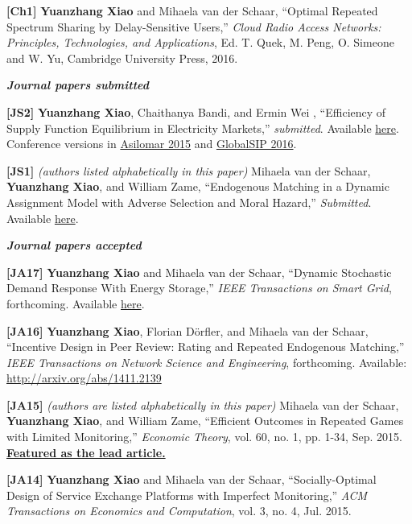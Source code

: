 \documentclass[margin,line]{res}
\begin{document}
\begin{resume}
\textbf{[Ch1]} {\bf Yuanzhang Xiao} and Mihaela van der Schaar, ``Optimal Repeated Spectrum Sharing by Delay-Sensitive Users,'' \emph{Cloud Radio Access Networks: Principles, Technologies, and Applications}, Ed. T. Quek, M. Peng, O. Simeone and W. Yu, Cambridge University Press, 2016.


{\em \textbf{Journal papers submitted}}

\vspace{-.3cm}


\textbf{[JS2]} {\bf Yuanzhang Xiao}, Chaithanya Bandi, and Ermin Wei , ``Efficiency of Supply Function Equilibrium in Electricity Markets,'' \emph{submitted}. Available \href{http://yuanzhangxiao.com/papers/XYZ-Bandi-Wei-Submitted2016.pdf}{here}. Conference versions in \href{http://yuanzhangxiao.com/papers/XYZ-Bandi-Wei-Asilomar2015.pdf}{Asilomar 2015} and \href{http://yuanzhangxiao.com/papers/XYZ-Bandi-Wei-GlobalSIP2016.pdf}{GlobalSIP 2016}.


\textbf{[JS1]} \emph{(authors listed alphabetically in this paper)} Mihaela van der Schaar, {\bf Yuanzhang Xiao}, and William Zame, ``Endogenous Matching in a Dynamic Assignment Model with Adverse Selection and Moral Hazard,'' \emph{Submitted}. Available \href{http://yuanzhangxiao.com/papers/VDS-XYZ-WZ-Submitted2016.pdf}{here}.


{\em \textbf{Journal papers accepted}}

\vspace{-.3cm}

\textbf{[JA17]} {\bf Yuanzhang Xiao} and Mihaela van der Schaar, ``Dynamic Stochastic Demand Response With Energy Storage,'' \emph{IEEE Transactions on Smart Grid}, forthcoming.  Available \href{http://arxiv.org/abs/1401.2185}{here}.

\textbf{[JA16]} {\bf Yuanzhang Xiao}, Florian D\"{o}rfler, and Mihaela van der Schaar, ``Incentive Design in Peer Review: Rating and Repeated Endogenous Matching,'' \emph{IEEE Transactions on Network Science and Engineering}, forthcoming. Available: \url{http://arxiv.org/abs/1411.2139}

\textbf{[JA15]} \emph{(authors are listed alphabetically in this paper)} Mihaela van der Schaar, {\bf Yuanzhang Xiao}, and William Zame, ``Efficient Outcomes in Repeated Games with Limited Monitoring,'' \emph{Economic Theory}, vol. 60, no. 1, pp. 1-34, Sep. 2015.
\href{http://link.springer.com/journal/199/60/1/page/1}{\textbf{Featured as the lead article.}}

\textbf{[JA14]} {\bf Yuanzhang Xiao} and Mihaela van der Schaar, ``Socially-Optimal Design of Service Exchange Platforms with Imperfect Monitoring,''
\emph{ACM Transactions on Economics and Computation}, vol. 3, no. 4, Jul. 2015.


\end{resume}
\end{document}

